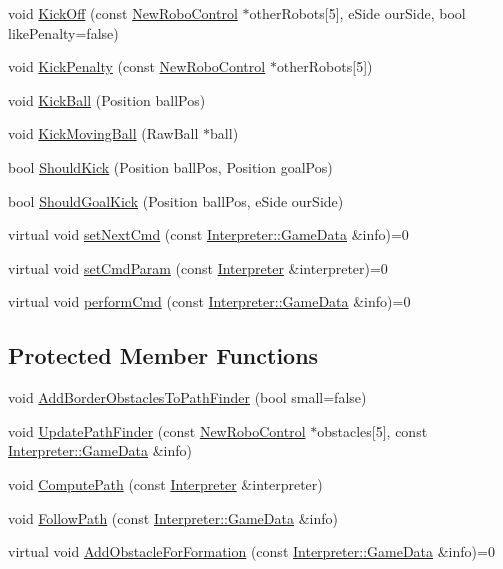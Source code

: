 \begin{DoxyCompactItemize}
void \hyperlink{classTeamRobot_a162c8b33d4315a61d8371dc9a923b37b}{KickOff} (const \hyperlink{classNewRoboControl}{NewRoboControl} $\ast$otherRobots\mbox{[}5\mbox{]}, eSide ourSide, bool likePenalty=false)
\item 
void \hyperlink{classTeamRobot_ad5755055df84960c8d1a0a40efe33668}{KickPenalty} (const \hyperlink{classNewRoboControl}{NewRoboControl} $\ast$otherRobots\mbox{[}5\mbox{]})
\item 
void \hyperlink{classTeamRobot_a66ddecf846c0300c346e80b6a48d800f}{KickBall} (Position ballPos)
\item 
void \hyperlink{classTeamRobot_a98d044ad3907493236b2d399a26cb9ac}{KickMovingBall} (RawBall $\ast$ball)
\item 
bool \hyperlink{classTeamRobot_ac979572f4899940e88f067102ac1ae46}{ShouldKick} (Position ballPos, Position goalPos)
\item 
bool \hyperlink{classTeamRobot_ae7f6fa303c865dad297b662731165883}{ShouldGoalKick} (Position ballPos, eSide ourSide)
\item 
virtual void \hyperlink{classTeamRobot_a65f9a2b7464dfac3f4a0336810cf574f}{setNextCmd} (const \hyperlink{structInterpreter_1_1GameData}{Interpreter::GameData} \&info)=0
\item 
virtual void \hyperlink{classTeamRobot_a34c0fd6986c510d4025e5752b3c0e49a}{setCmdParam} (const \hyperlink{classInterpreter}{Interpreter} \&interpreter)=0
\item 
virtual void \hyperlink{classTeamRobot_a9b84df51ca16a7203fdb6498ea6741da}{performCmd} (const \hyperlink{structInterpreter_1_1GameData}{Interpreter::GameData} \&info)=0
\end{DoxyCompactItemize}
\subsection*{Protected Member Functions}
\begin{DoxyCompactItemize}
\item 
void \hyperlink{classTeamRobot_acf4c435c98bc406744a12cd140d6631d}{AddBorderObstaclesToPathFinder} (bool small=false)
\item 
void \hyperlink{classTeamRobot_a1216ffb71821002b6e6845390c990d5f}{UpdatePathFinder} (const \hyperlink{classNewRoboControl}{NewRoboControl} $\ast$obstacles\mbox{[}5\mbox{]}, const \hyperlink{structInterpreter_1_1GameData}{Interpreter::GameData} \&info)
\item 
void \hyperlink{classTeamRobot_a9ae431d9eeaa1d16fa28c636499ab553}{ComputePath} (const \hyperlink{classInterpreter}{Interpreter} \&interpreter)
\item 
void \hyperlink{classTeamRobot_a02df00aae0a514badc93a9b2593be85f}{FollowPath} (const \hyperlink{structInterpreter_1_1GameData}{Interpreter::GameData} \&info)
\item 
virtual void \hyperlink{classTeamRobot_a71ec65db46db1ac511fe17b668d4f192}{AddObstacleForFormation} (const \hyperlink{structInterpreter_1_1GameData}{Interpreter::GameData} \&info)=0
\end{DoxyCompactItemize}
